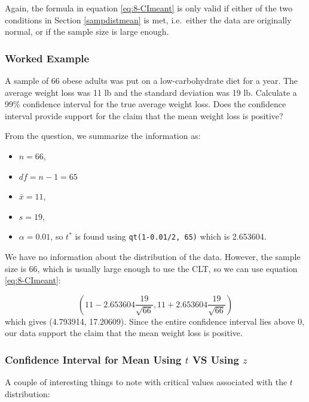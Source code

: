 \documentclass[
]{book}
\providecommand{\tightlist}{%
  \setlength{\itemsep}{0pt}\setlength{\parskip}{0pt}}
\begin{document}
Again, the formula in equation \eqref{eq:8-CImeant} is only valid if either of the two conditions in Section \ref{sampdistmean} is met, i.e.~either the data are originally normal, or if the sample size is large enough.

\hypertarget{worked-example-2}{%
\subsubsection{Worked Example}\label{worked-example-2}}

A sample of 66 obese adults was put on a low-carbohydrate diet for a year. The average weight loss was 11 lb and the
standard deviation was 19 lb. Calculate a 99\% confidence interval for the true average weight loss. Does the confidence interval provide support for the claim that the mean weight loss is positive?

From the question, we summarize the information as:

\begin{itemize}
\tightlist
\item
  \(n = 66\),
\item
  \(df = n-1 = 65\)
\item
  \(\bar{x} = 11\),
\item
  \(s = 19\),
\item
  \(\alpha = 0.01\), so \(t^*\) is found using \texttt{qt(1-0.01/2,\ 65)} which is 2.653604.
\end{itemize}

We have no information about the distribution of the data. However, the sample size is 66, which is usually large enough to use the CLT, so we can use equation \eqref{eq:8-CImeant}:

\[
\left( 11 - 2.653604 \frac{19}{\sqrt{66}} , 11 + 2.653604 \frac{19}{\sqrt{66}} \right)
\]
which gives (4.793914, 17.20609). Since the entire confidence interval lies above 0, our data support the claim that the mean weight loss is positive.

\hypertarget{confidence-interval-for-mean-using-t-vs-using-z}{%
\subsubsection{\texorpdfstring{Confidence Interval for Mean Using \(t\) VS Using \(z\)}{Confidence Interval for Mean Using t VS Using z}}\label{confidence-interval-for-mean-using-t-vs-using-z}}

A couple of interesting things to note with critical values associated with the \(t\) distribution:
\end{document}
